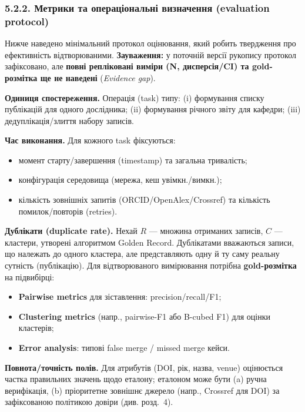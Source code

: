 \subsubsection*{5.2.2. Метрики та операціональні визначення (evaluation protocol)}

Нижче наведено мінімальний протокол оцінювання, який робить твердження про ефективність відтворюваними. \textbf{Зауваження:} у поточній версії рукопису протокол зафіксовано, але \textbf{повні репліковані виміри (N, дисперсія/CI) та gold-розмітка ще не наведені} (\textit{Evidence gap}).

\textbf{Одиниця спостереження.} Операція (task) типу: (i) формування списку публікацій для одного дослідника; (ii) формування річного звіту для кафедри; (iii) дедуплікація/злиття набору записів.

\textbf{Час виконання.} Для кожного task фіксуються:
\begin{itemize}[leftmargin=*,itemsep=0.2em]
\item момент старту/завершення (timestamp) та загальна тривалість;
\item конфігурація середовища (мережа, кеш увімкн./вимкн.);
\item кількість зовнішніх запитів (ORCID/OpenAlex/Crossref) та кількість помилок/повторів (retries).
\end{itemize}

\textbf{Дублікати (duplicate rate).} Нехай $R$ --- множина отриманих записів, $C$ --- кластери, утворені алгоритмом Golden Record. Дублікатами вважаються записи, що належать до одного кластера, але представляють одну й ту саму реальну сутність (публікацію). Для відтворюваного вимірювання потрібна \textbf{gold-розмітка} на підвибірці:
\begin{itemize}[leftmargin=*,itemsep=0.2em]
\item \textbf{Pairwise metrics} для зіставлення: precision/recall/F1;
\item \textbf{Clustering metrics} (напр., pairwise-F1 або B-cubed F1) для оцінки кластерів;
\item \textbf{Error analysis}: типові false merge / missed merge кейси.
\end{itemize}

\textbf{Повнота/точність полів.} Для атрибутів (DOI, рік, назва, venue) оцінюється частка правильних значень щодо еталону; еталоном може бути (a) ручна верифікація, (b) пріоритетне зовнішнє джерело (напр., Crossref для DOI) за зафіксованою політикою довіри (див. розд.~4).

